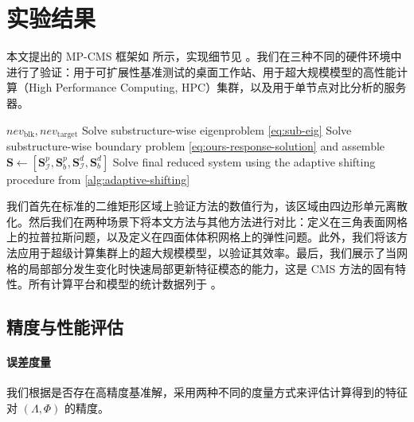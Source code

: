 \section{实验结果}
\label{sec:results}

本文提出的 MP-CMS 框架如  所示，实现细节见 。我们在三种不同的硬件环境中进行了验证：用于可扩展性基准测试的桌面工作站、用于超大规模模型的高性能计算（High Performance Computing, HPC）集群，以及用于单节点对比分析的服务器。


\begin{algorithm}[H]
  \caption{多重划分 CMS}\label{alg:pd-cms}
  \begin{algorithmic}[1]
    \REQUIRE $nev_{\text{blk}},nev_{\text{target}}$
    \STATE {}
      \STATE Solve substructure-wise eigenproblem \cref{eq:sub-eig}
    \ENDFOR
    \STATE {}
      \STATE Solve substructure-wise boundary problem \cref{eq:ours-response-solution} and assemble
    \ENDFOR
    \STATE $\mathbf{S} \leftarrow [\mathbf{S}^p_\mathcal{I},\mathbf{S}^p_b,\mathbf{S}_{\mathcal{I}}^d,\mathbf{S}_{b}^d]$
    \STATE Solve final reduced system using the adaptive shifting procedure from \cref{alg:adaptive-shifting}
  \end{algorithmic}
\end{algorithm}

我们首先在标准的二维矩形区域上验证方法的数值行为，该区域由四边形单元离散化。然后我们在两种场景下将本文方法与其他方法进行对比：定义在三角表面网格上的拉普拉斯问题，以及定义在四面体体积网格上的弹性问题。此外，我们将该方法应用于超级计算集群上的超大规模模型，以验证其效率。最后，我们展示了当网格的局部部分发生变化时快速局部更新特征模态的能力，这是 CMS 方法的固有特性。所有计算平台和模型的统计数据列于 。

\subsection{精度与性能评估}\label{sec:evaluation}
\paragraph{误差度量}
我们根据是否存在高精度基准解，采用两种不同的度量方式来评估计算得到的特征对 $(\Lambda, \Phi)$ 的精度。

